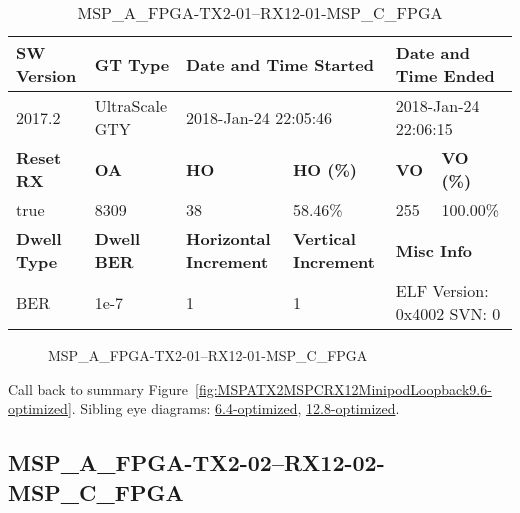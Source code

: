 \begin{table}[h]
\centering
\caption{MSP\_A\_FPGA-TX2-01--RX12-01-MSP\_C\_FPGA}
\label{tab:MSPAFPGATX201RX1201MSPCFPGA9.6-optimized}
\begin{tabular}{@{}|l|l|l|l|l|l|@{}}
\toprule
\textbf{SW Version}                & \textbf{GT Type}   & \multicolumn{2}{l|}{\textbf{Date and Time Started}}            & \multicolumn{2}{l|}{\textbf{Date and Time Ended}}        \\ \midrule
2017.2                       & UltraScale GTY          & \multicolumn{2}{l|}{2018-Jan-24 22:05:46}                   & \multicolumn{2}{l|}{2018-Jan-24 22:06:15}               \\ \midrule
\textbf{Reset RX}                  & \textbf{OA} & \textbf{HO}   & \textbf{HO (\%)} & \textbf{VO} & \textbf{VO (\%)} \\ \midrule
true & 8309        & 38          & 58.46\%        & 255        & 100.00\%       \\ \midrule
\textbf{Dwell Type}                & \textbf{Dwell BER} & \textbf{Horizontal Increment} & \textbf{Vertical Increment}    & \multicolumn{2}{l|}{\textbf{Misc Info}}                  \\ \midrule
BER                            & 1e-7        & 1        & 1           & \multicolumn{2}{l|}{ELF Version: 0x4002 SVN: 0}                         \\ \bottomrule
\end{tabular}
\end{table}

\begin{figure}[h]
\caption{MSP\_A\_FPGA-TX2-01--RX12-01-MSP\_C\_FPGA} \label{fig:MSPAFPGATX201RX1201MSPCFPGA9.6-optimized}
\end{figure}

Call back to summary Figure~\ref{fig:MSPATX2MSPCRX12MinipodLoopback9.6-optimized}.
Sibling eye diagrams: \hyperref[sec:MSPAFPGATX201RX1201MSPCFPGA6.4-optimized]{6.4-optimized}, \hyperref[sec:MSPAFPGATX201RX1201MSPCFPGA12.8-optimized]{12.8-optimized}.

\clearpage
\newpage


\subsection{MSP\_A\_FPGA-TX2-02--RX12-02-MSP\_C\_FPGA}\label{sec:MSPAFPGATX202RX1202MSPCFPGA9.6-optimized}

